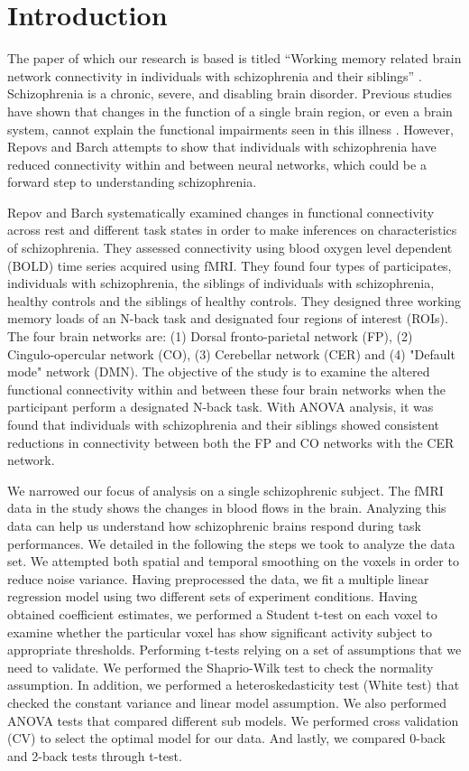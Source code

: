 \section{Introduction}

\par The paper of which our research is based is titled ``Working memory related
brain network connectivity in individuals with schizophrenia and their
siblings'' \cite{repovs_barch1, repovs_barch2}. Schizophrenia is a chronic,
severe, and disabling brain disorder. Previous studies have shown that changes
in the function of a single brain region, or even a brain system, cannot explain
the functional impairments seen in this illness \cite{kircher_thienel, repovs_barch1}.
However, Repovs and Barch attempts to show that individuals with schizophrenia
have reduced connectivity within and between neural networks, which could be a
forward step to understanding schizophrenia. 

Repov and Barch systematically examined changes in functional connectivity across
rest and different task states in order to make inferences on characteristics
of schizophrenia. They assessed connectivity using blood oxygen level dependent
(BOLD) time series acquired using fMRI. They found four types of participates, 
individuals with schizophrenia, the siblings of individuals with schizophrenia, healthy 
controls and the siblings of healthy controls. They designed three working memory 
loads of an N-back task and designated four regions of interest (ROIs). The four brain
networks are: (1) Dorsal fronto-parietal network (FP), (2) Cingulo-opercular
network (CO), (3) Cerebellar network (CER) and (4) "Default mode" network (DMN).
The objective of the study is to examine the altered functional connectivity
within and between these four brain networks when the participant perform a
designated N-back task. With ANOVA analysis, it was found that individuals with
schizophrenia and their siblings showed consistent reductions in connectivity
between both the FP and CO networks with the CER network. 

We narrowed our focus of analysis on a single schizophrenic
subject. The fMRI data in the study shows the changes in
blood flows in the brain. Analyzing this data can help us understand how
schizophrenic brains respond during task performances. We detailed in the following the 
steps we took to analyze the data set. We attempted both spatial and temporal 
smoothing on the voxels in order to reduce noise variance. Having preprocessed the 
data, we fit a multiple linear regression model using two different sets of experiment
conditions. Having obtained coefficient estimates, we performed a Student t-test on each 
voxel to examine whether the particular voxel has show significant activity subject to 
appropriate thresholds. Performing t-tests relying on a set of assumptions that we need 
to validate. We performed the Shaprio-Wilk test to check the normality assumption. In 
addition, we performed a heteroskedasticity test (White test) that checked  the constant 
variance and linear model assumption. We also performed ANOVA tests that compared
different sub models. We performed cross validation (CV) to select the optimal model for 
our data. And lastly, we compared 0-back and 2-back tests through t-test. 

